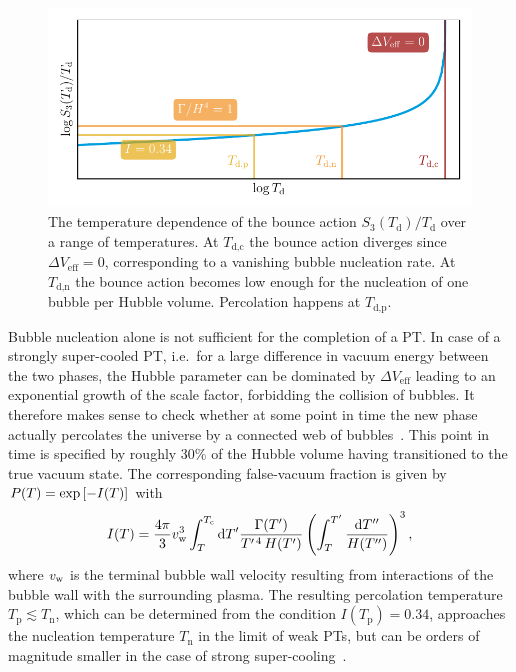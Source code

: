 \begin{figure}[t]
	\centering
	\includegraphics[width=\linewidth]{thesisplots/nuclcrit/nuclcrit}
	\caption{
		The temperature dependence of the bounce action $S_3(T_\text{d}) / T_\text{d}$ over a range of temperatures. At {\color{DESYdunkelrot} $T_\text{d,c}$} the bounce  action diverges since $\Delta V_\text{eff} = 0$, corresponding to a vanishing bubble nucleation rate. At {\color{DESYorange} $T_\text{d,n}$} the bounce action becomes low enough for the nucleation of one bubble per Hubble volume. Percolation happens at {\color{DESYgelb} $T_\text{d,p}$}.}
	\label{fig:nuclcrit}
\end{figure}

Bubble nucleation alone is not sufficient for the completion of a \ac{PT}. In case of a strongly super-cooled \ac{PT}, i.e.~for a large difference in vacuum energy between the two phases, the Hubble parameter can be dominated by $\Delta V_\text{eff}$ leading to an exponential growth of the scale factor, forbidding the collision of bubbles. It therefore makes sense to check  whether at some point in time the new phase actually percolates the universe by a connected web of bubbles~\cite{Guo:2021qcq, Athron:2023rfq,Caprini:2019egz}. This point in time is specified by roughly 30\% of the Hubble volume having transitioned to the true vacuum state. The corresponding false-vacuum fraction is given by $P(T) = \exp \left[ -I(T) \right]$ with~\cite{Athron:2023xlk}
\begin{align}
	I(T) = \frac{4 \pi}{3} v_\mathrm{w}^3 \int^{T_\text{c}}_{T} \mathop{}\!\mathrm{d} T^\prime  \frac{\Gamma(T^\prime)}{T^{\prime\,4} \, H(T^\prime) } \left( \int_{T}^{T^\prime}  \frac{\mathop{}\!\mathrm{d} T^{\prime\prime}}{H(T^{\prime\prime})} \right)^3 , \label{eq:falsvacfrac}
\end{align}
where $v_\mathrm{w}$ is the terminal bubble wall velocity resulting from interactions of the bubble wall with the surrounding plasma. The resulting percolation temperature $T_\text{p} \lesssim T_\text{n}$, which can be determined from the condition $I(T_\text{p}) = 0.34$, approaches the nucleation temperature $T_\text{n}$ in the limit of weak \acp{PT}, but can be orders of magnitude smaller in the case of strong super-cooling~\cite{Ellis:2018mja}.

